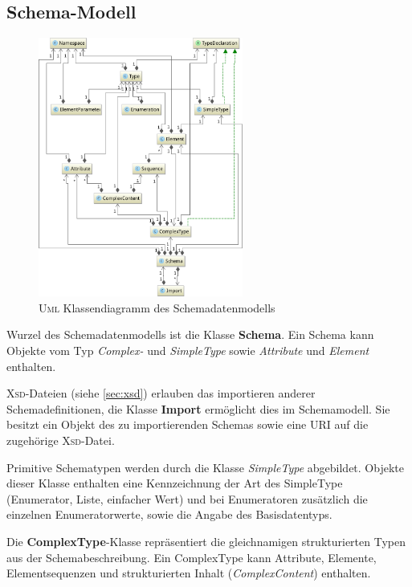 \subsection{Schema-Modell}
\label{sec:schema_model}

\begin{figure}[t]
    \centering
    \includegraphics[width=0.6\textwidth]{resources/typemodel}
    \caption{\textsc{Uml} Klassendiagramm des Schemadatenmodells}
    \label{fig:schema_model}
\end{figure}

Wurzel des Schemadatenmodells ist die Klasse \textbf{Schema}. Ein Schema kann Objekte vom Typ \emph{Complex-} und \emph{SimpleType} sowie \emph{Attribute} und \emph{Element} enthalten.

\textsc{Xsd}-Dateien (siehe \cref{sec:xsd}) erlauben das importieren anderer Schemadefinitionen, die Klasse \textbf{Import} ermöglicht dies im Schemamodell. Sie besitzt ein Objekt des zu importierenden Schemas sowie eine \gls{URI} auf die zugehörige \textsc{Xsd}-Datei.

Primitive Schematypen werden durch die Klasse \emph{SimpleType} abgebildet. Objekte dieser Klasse enthalten eine Kennzeichnung der Art des SimpleType (Enumerator, Liste, einfacher Wert) und bei Enumeratoren zusätzlich die einzelnen Enumeratorwerte, sowie die Angabe des Basisdatentyps.

Die \textbf{ComplexType}-Klasse repräsentiert die gleichnamigen strukturierten Typen aus der Schemabeschreibung. 
Ein ComplexType kann Attribute, Elemente, Elementsequenzen und strukturierten Inhalt (\emph{ComplexContent}) enthalten.


